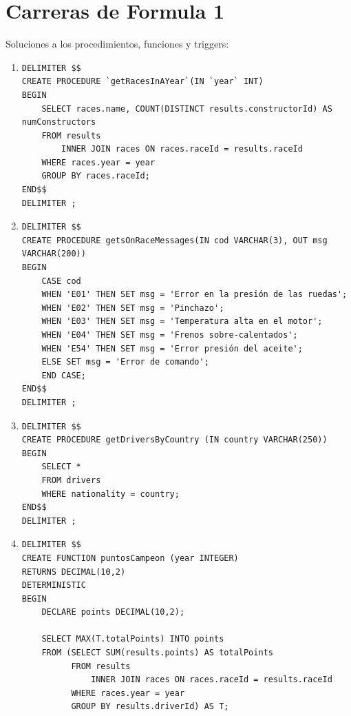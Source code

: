 \documentclass[a4paper]{article}
\begin{document}
\section*{Carreras de Formula 1}

Soluciones a los procedimientos, funciones y triggers:

\begin{enumerate}
    \item 
    \begin{verbatim}
DELIMITER $$
CREATE PROCEDURE `getRacesInAYear`(IN `year` INT)
BEGIN
	SELECT races.name, COUNT(DISTINCT results.constructorId) AS numConstructors
    FROM results
    	INNER JOIN races ON races.raceId = results.raceId
    WHERE races.year = year
    GROUP BY races.raceId;
END$$
DELIMITER ;
    \end{verbatim}
    
    \item
    \begin{verbatim}
DELIMITER $$
CREATE PROCEDURE getsOnRaceMessages(IN cod VARCHAR(3), OUT msg VARCHAR(200))
BEGIN
	CASE cod
    WHEN 'E01' THEN SET msg = 'Error en la presión de las ruedas';
    WHEN 'E02' THEN SET msg = 'Pinchazo';
    WHEN 'E03' THEN SET msg = 'Temperatura alta en el motor';
    WHEN 'E04' THEN SET msg = 'Frenos sobre-calentados';
    WHEN 'E54' THEN SET msg = 'Error presión del aceite';
    ELSE SET msg = 'Error de comando';
    END CASE;
END$$
DELIMITER ;
    \end{verbatim}
    
    \item
    \begin{verbatim}
DELIMITER $$
CREATE PROCEDURE getDriversByCountry (IN country VARCHAR(250))
BEGIN
    SELECT *
    FROM drivers
    WHERE nationality = country;
END$$
DELIMITER ;
    \end{verbatim}
    
    \item
    \begin{verbatim}
DELIMITER $$
CREATE FUNCTION puntosCampeon (year INTEGER)
RETURNS DECIMAL(10,2)
DETERMINISTIC
BEGIN
	DECLARE points DECIMAL(10,2);

    SELECT MAX(T.totalPoints) INTO points
    FROM (SELECT SUM(results.points) AS totalPoints
          FROM results
              INNER JOIN races ON races.raceId = results.raceId
          WHERE races.year = year
          GROUP BY results.driverId) AS T;
          

\end{verbatim}
\end{enumerate}
\end{document}
